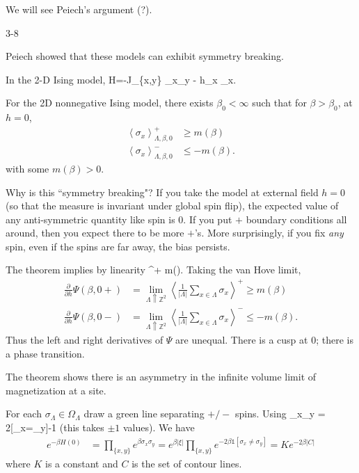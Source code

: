 \documentclass[12pt]{book}
\theoremstyle{norm}
\begin{document}

We will see Peiech's argument (?).


{\color{blue}3-8}

Peiech showed that these models can exhibit symmetry breaking.

In the 2-D Ising model, 
\be
H=-J\sum_{\{x,y\}} \sigma_x\sigma_y - h\sum_x \sigma_x.
\ee
\begin{theorem}[Peiech]
For the 2D nonnegative Ising model, there exists $\beta_0<\infty$ such that for $\beta>\beta_0$, at $h=0$,
\begin{align*}
\left\langle {\sigma_x}\right\rangle_{\Lambda,\beta,0}^+ &\ge m(\beta)\\
\left\langle {\sigma_x}\right\rangle_{\Lambda,\beta,0}^- & \le -m(\beta).
\end{align*}
with some $m(\beta)>0$. 
\end{theorem}
Why is this ``symmetry breaking"? If you take the model at external field $h=0$ (so that the measure is invariant under global spin flip), the expected value of any anti-symmetric quantity like spin is 0. If you put $+$ boundary conditions all around, then you expect there to be more $+$'s.  
More surprisingly, if you fix \emph{any} spin, even if the spins are far away, the bias persists.

The theorem implies by linearity
\be
\left{}\right\rangle^+ \ge m(\beta).
\ee
Taking the van Hove limit,
\begin{align*}
\frac{\partial}{\partial h} \Psi(\beta,0+) & = \lim_{\Lambda\Uparrow \mathbb{Z}^2} \left\langle {\frac{1}{|\Lambda|} \sum_{x\in \Lambda} \sigma_x}\right\rangle^+ \ge m(\beta)\\
\frac{\partial}{\partial h} \Psi(\beta,0-)& = \lim_{\Lambda\Uparrow \mathbb{Z}^2} \left\langle {\frac{1}{|\Lambda|} \sum_{x\in \Lambda} \sigma_x}\right\rangle^- \le - m(\beta).
\end{align*}
Thus the left and right derivatives of $\Psi$ are unequal. There is a cusp at 0; there is a phase transition.

The theorem shows there is an asymmetry in the infinite volume limit of magnetization at a site.

For each $\sigma_{\Lambda}\in \Omega_\Lambda$ draw a green line separating $+/-$ spins. 
Using
\be\sigma_x\sigma_y = 2[\sigma_x=\sigma_y]-1\ee
(this takes $\pm1$ values). 
We have
\begin{align*}
e^{-\beta H(0)}&=\prod_{\{x,y\}} e^{\beta \sigma_x\sigma_y} = e^{\beta|\xi|} \prod_{\{x,y\}}  e^{-2\beta \mathds{1}[\sigma_x\ne \sigma_y]} = K e^{-2\beta|C|}
\end{align*}
where $K$ is a constant and $C$ is the set of contour lines.
\end{document}
